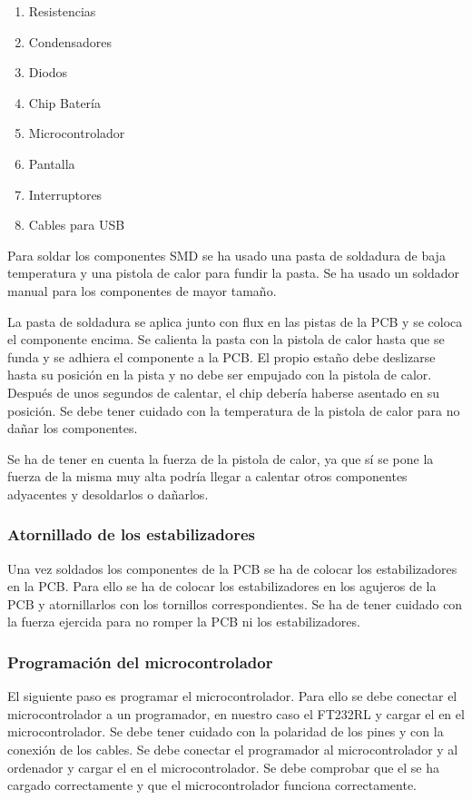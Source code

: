 \begin{enumerate}
    \item Resistencias
    \item Condensadores
    \item Diodos
    \item Chip Batería
    \item Microcontrolador
    \item Pantalla
    \item Interruptores
    \item Cables para \gls{USB}
\end{enumerate}

Para soldar los componentes \gls{SMD} se ha usado una pasta de soldadura de baja temperatura y una pistola de calor para fundir la pasta. Se ha usado un soldador manual para los componentes de mayor tamaño.

La pasta de soldadura se aplica junto con flux en las pistas de la \gls{PCB} y se coloca el componente encima. Se calienta la pasta con la pistola de calor hasta que se funda y se adhiera el componente a la \gls{PCB}. El propio estaño debe deslizarse hasta su posición en la pista y no debe ser empujado con la pistola de calor. Después de unos segundos de calentar, el chip debería haberse asentado en su posición. Se debe tener cuidado con la temperatura de la pistola de calor para no dañar los componentes.

Se ha de tener en cuenta la fuerza de la pistola de calor, ya que sí se pone la fuerza de la misma muy alta podría llegar a calentar otros componentes adyacentes y desoldarlos o dañarlos. \cite{SoldaduraSMD}

\subsubsection{Atornillado de los estabilizadores}
Una vez soldados los componentes de la \gls{PCB} se ha de colocar los estabilizadores en la \gls{PCB}. Para ello se ha de colocar los estabilizadores en los agujeros de la \gls{PCB} y atornillarlos con los tornillos correspondientes. Se ha de tener cuidado con la fuerza ejercida para no romper la \gls{PCB} ni los estabilizadores.

\subsubsection{Programación del microcontrolador}
El siguiente paso es programar el microcontrolador. Para ello se debe conectar el microcontrolador a un programador, en nuestro caso el FT232RL y cargar el  en el microcontrolador. Se debe tener cuidado con la polaridad de los pines y con la conexión de los cables. Se debe conectar el programador al microcontrolador y al ordenador y cargar el  en el microcontrolador. Se debe comprobar que el  se ha cargado correctamente y que el microcontrolador funciona correctamente.

